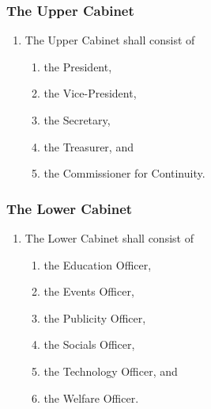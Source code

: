 \documentclass{scrartcl}
\begin{document}
            \subsubsection{The Upper Cabinet}
                \label{executive--cabinet--upper}
                \begin{enumerate}
                    \item The Upper Cabinet shall consist of
                        \begin{enumerate}
                            \item the President,
                            \item the Vice-President,
                            \item the Secretary,
                            \item the Treasurer, and
                            \item the Commissioner for Continuity.
                        \end{enumerate}
                \end{enumerate}

            \subsubsection{The Lower Cabinet}
                \label{executive--cabinet--lower}
                \begin{enumerate}
                    \item The Lower Cabinet shall consist of
                        \begin{enumerate}
                            \item the Education Officer,
                            \item the Events Officer,
                            \item the Publicity Officer,
                            \item the Socials Officer,
                            \item the Technology Officer, and
                            \item the Welfare Officer.
                        \end{enumerate}
                \end{enumerate}
\end{document}

